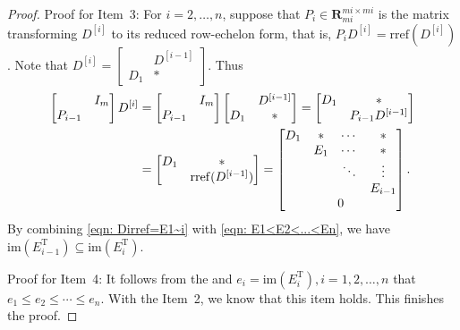 \documentclass[sort&compress]{elsarticle}
\newcommand\rref{\mathrm{rref}}
\newcommand\im{\mathrm{im}}
\newcommand\imr[1]{\mathrm{im}(#1^\mathrm T)}
\newcommand\R{\mathbf R}
\newcommand\T{\mathrm T}
\begin{document}
{\begin{proof}
Proof for Item~3:
For $i=2,\dots,n$, suppose that $P_i\in\R^{mi\times mi}_{mi}$
is the matrix transforming $D^{[i]}$
to its reduced row-echelon form,
that is, $P_iD^{[i]}=\rref(D^{[i]})$.
Note that
$
D^{[i]}=\begin{bmatrix}&D^{[i-1]}\\ D_1&*\end{bmatrix}
$.
Thus
\begin{align}\label{eqn: E1<E2<...<En}
\begin{bmatrix}&I_m\\ P_{i-1}&\end{bmatrix}D^{[i]}
\notag&=\begin{bmatrix}&I_m\\ P_{i-1}&\end{bmatrix}
\begin{bmatrix}&D^{[i-1]}\\ D_1&*\end{bmatrix}
=\begin{bmatrix}D_1&*\\ &P_{i-1}D^{[i-1]}\end{bmatrix}\\
&=\begin{bmatrix}D_1&*\\ &\rref(D^{[i-1]})\end{bmatrix}
=\begin{bmatrix}
D_1&*&\cdots&*\\
&E_1&\cdots&*\\
&&\ddots&\vdots\\
&&&E_{i-1}\\
\multicolumn{4}{c}{0}
\end{bmatrix}.
\end{align}
By combining \eqref{eqn: Dirref=E1~i} with \eqref{eqn: E1<E2<...<En},
we have $\imr{E_{i-1}}\subseteq\imr{E_i}$.

Proof for Item~4:
It follows from the  and $e_i=\im(E_i^\T),i=1,2,\dots,n$ that
$e_1\le e_2\le\cdots\le e_n$.
With the Item~2, we know that this item holds.
This finishes the proof.
\end{proof}}
\end{document}
